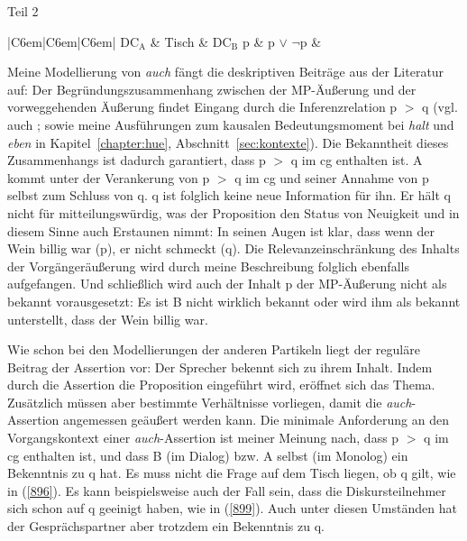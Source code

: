 {\begin{exe}
\begin{xlist}
 		\ex\label{898b} Teil 2\\[-1em]
 		\begin{tabular}[t]{|C{6em}|C{6em}|C{6em}|} 
 		\hline 	
   		$\textrm{DC}_{\textrm{A}}$ & {Tisch} & $\textrm{DC}_{\textrm{B}}$ \tabularnewline
 	 	\hline
     	p & p $\vee$ $\neg$p & \tabularnewline
  		\hline      
   		 \tabularnewline   
   		\hline
 		\end{tabular} 		
 	\end{xlist}
	\end{exe}
Meine Modellierung von \textit{auch} fängt die deskriptiven Beiträge aus der Literatur auf: Der Begründungszusammenhang zwischen der MP-Äußerung und der vorweggehenden Äußerung findet Eingang durch die Inferenzrelation p $>$ q (vgl. auch \citealt[341-342]{Karagjosova2003}; \citeyear[220-235]{Karagjosova2004} sowie meine Ausführungen zum kausalen Bedeutungsmoment bei \textit{halt} und \textit{eben} in Kapitel~\ref{chapter:hue}, Abschnitt~\ref{sec:kontexte}). Die Bekanntheit dieses Zusammenhangs ist dadurch garantiert, dass p $>$ q im cg ent\-halten ist. A kommt unter der Verankerung von p $>$ q im cg und seiner Annahme von p selbst zum Schluss von q. q ist folglich keine neue Information für ihn. Er hält q nicht für mitteilungswürdig, was der Proposition den Status von Neuigkeit und in diesem Sinne auch Erstaunen nimmt: In seinen Augen ist klar, dass wenn der Wein billig war (p), er nicht schmeckt (q). Die Relevanzeinschränkung des Inhalts der Vorgängeräußerung wird durch meine Beschreibung folglich ebenfalls aufgefangen. Und schließlich wird auch der Inhalt p der MP-Äußerung nicht als bekannt vorausgesetzt: Es ist B nicht wirklich bekannt oder wird ihm als bekannt unterstellt, dass der Wein billig war.

Wie schon bei den Modellierungen der anderen Partikeln liegt der reguläre Beitrag der Assertion vor: Der Sprecher bekennt sich zu ihrem Inhalt. Indem durch die Assertion die Proposition eingeführt wird, eröffnet sich das Thema. Zusätzlich müssen aber bestimmte Verhältnisse vorliegen, damit die \textit{auch}-Asser\-tion angemessen geäußert werden kann. Die minimale Anforderung an den Vorgangskontext einer \textit{auch}-Assertion ist meiner Meinung nach, dass p $>$ q im cg enthalten ist, und dass B (im Dialog) bzw. A selbst (im Monolog) ein Bekenntnis zu q hat. Es muss nicht die Frage auf dem Tisch liegen, ob q gilt, wie in (\ref{896}). Es kann beispielsweise auch der Fall sein, dass die Diskursteilnehmer sich schon auf q geeinigt haben, wie in (\ref{899}). Auch unter diesen Umständen hat der Gesprächspartner aber trotzdem ein Bekenntnis zu q.

}
